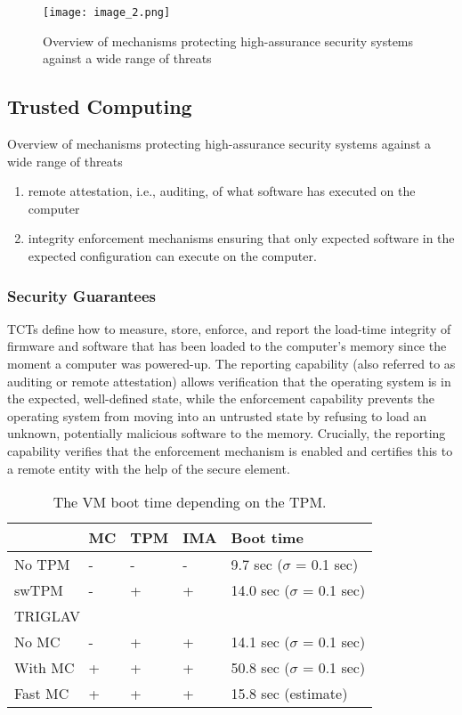 \documentclass[11pt,twoside]{book}
\begin{document}
\begin{figure}[h!]
    \centering
    \texttt{[image: image\_2.png]}
    \caption{Overview of mechanisms protecting high-assurance security systems against a wide range of threats}
    \label{3}
\end{figure}
\subsection{Trusted Computing}
\raggedright Overview of mechanisms protecting high-assurance security systems against a wide range of threats
\noindent
\begin{enumerate}
\item remote attestation, i.e., auditing, of what software has executed on the computer 
\item integrity enforcement mechanisms ensuring that only expected software in the expected configuration can execute on the computer. 
\end{enumerate}
\subsubsection{Security Guarantees}
\raggedright TCTs define how to measure, store, enforce, and report the load-time integrity of firmware and software that has been loaded to the computer’s memory since the moment a computer was powered-up. The reporting capability (also referred to as auditing or remote attestation) allows verification that the operating system is in the expected, well-defined state, while the enforcement capability prevents the operating system from moving into an untrusted state by refusing to load an unknown, potentially malicious software to the memory. Crucially, the reporting capability verifies that the enforcement mechanism is enabled and certifies this to a remote entity with the help of the secure element.

\begin{table}[h!]
    \begin{center}
        \caption{The VM boot time depending on the TPM.}
        \label{5}
          \begin{tabular}{|p{3cm}|p{2cm}|p{2cm}|p{2cm}|p{4.5cm}|}
          \hline
           &MC&TPM&IMA&Boot time\\
          \hline
          No TPM&-&-&-&9.7 sec ($\sigma$ = 0.1 sec)\\
          \hline
          swTPM&-&+&+&14.0 sec ($\sigma$ = 0.1 sec)\\
          \hline
          \multicolumn{5}{|l|}{TRIGLAV}\\
          \hline
          No MC&-&+&+&14.1 sec ($\sigma$ = 0.1 sec)\\
          \hline
          With MC&+&+&+&50.8 sec ($\sigma$ = 0.1 sec)\\
          \hline
          Fast MC&+&+&+&15.8 sec (estimate)\\
          \hline
          \end{tabular}
   \end{center}
\end{table}
\end{document}
